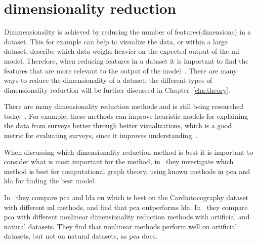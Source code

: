 
\section{dimensionality reduction}\label{sec:dimensionality-reduction-problem}

Dimmensionality is achieved by reducing the number of features(dimensions) in a dataset. This for example can help to visualize the data, or within a large dataset, describe which data weighs heavier on the expected output of the \gls{ml} model. Therefore, when reducing features in a dataset it is important to find the features that are more relevant to the output of the model~\cite{Feature-engineering-zheng}. There are many ways to reduce the dimensionality of a dataset, the different types of dimensionality reduction will be further discussed in Chapter~\ref{cha:theory}.

There are many dimensionality reduction methods and is still being researched today~\cite{dimensionality-reduction-cheng}. For example, these methods can improve heuristic models for explaining the data from surveys better through better visualizations, which is a good metric for evaluating surveys, since it improves understanding~\cite{dimensionality-reduction-cheng}.

When discussing which dimensionality reduction method is best it is important to consider what is most important for the method, in~\cite{dimensionality-reduction-maitra} they investigate which method is best for computational graph theory, using known methods in \gls{pca} and \gls{lda} for finding the best model.

In~\cite{dimensionality-reduction-reddy} they compare \gls{pca} and \gls{lda} on which is best on the Cardiotocography dataset with different \gls{ml} methods, and find that \gls{pca} outperforms \gls{lda}. In~\cite{dimensionality-reduction-comparative-review} they compare \gls{pca} with different nonlinear dimensionality reduction methods with artificial and natural datasets. They find that nonlinear methods perform well on artificial datasets, but not on natural datasets, as \gls{pca} does.

